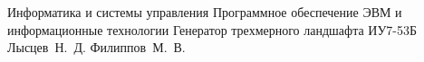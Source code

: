 \documentclass{bmstu}
\begin{document}
\makecourseworktitle
{Информатика и системы управления}
{Программное обеспечение ЭВМ и информационные технологии}
{Генератор трехмерного ландшафта}
{ИУ7-53Б}
{Лысцев~Н.~Д.}
{Филиппов~М.~В.}
{}
{}

\maketableofcontents

%
%







\makebibliography

%
\end{document}

